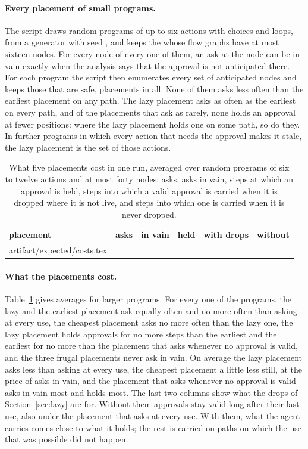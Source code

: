\documentclass[acmsmall,nonacm,screen]{acmart}
\makeatletter
\newcommand{\claim}[2]{#2}
\newcommand{\rows}[1]{\@@input artifact/expected/#1.tex }
\makeatother
\begin{document}
\paragraph{Every placement of small programs.} The script draws random programs of up to
six actions with choices and loops, from a generator with seed \exSeed{}, and keeps the
\exGraphs{} whose flow graphs have at most sixteen nodes. \claim{frugal}{For every node of
every one of them, an ask at the node can be in vain exactly when the analysis says that
the approval is not anticipated there.} For each program the script then enumerates every
set of anticipated nodes and keeps those that are safe, \exPlacements{} placements in all.
\claim{earliest}{None of them asks less often than the earliest placement on any path.}
\claim{lazy}{The lazy placement asks as often as the earliest on every path, and of the
\exOptimal{} placements that ask as rarely, none holds an approval at fewer positions: where
the lazy placement holds one on some path, so do they.} \claim{one-shot}{In \exOneShot{}
further programs in which every action that needs the approval makes it stale, the lazy
placement is the set of those actions.}

\begin{table}
\caption{What five placements cost in one run, averaged over \exPrograms{} random programs
of six to twelve actions and at most forty nodes: asks, asks in vain, steps at which an approval is held, steps into
which a valid approval is carried when it is dropped where it is not live, and steps into
which one is carried when it is never dropped.}
\label{tab:costs}
\small
\begin{tabular}{lrrrrr}
\toprule
placement & asks & in vain & held & with drops & without \\
\midrule
\rows{costs}
\bottomrule
\end{tabular}
\end{table}

\paragraph{What the placements cost.} Table~\ref{tab:costs} gives averages for larger
programs. \claim{costs}{For every one of the programs, the lazy and the earliest placement
ask equally often and no more often than asking at every use, the cheapest placement asks
no more often than the lazy one, the lazy placement holds approvals for no more steps than
the earliest and the earliest for no more than the placement that asks whenever no approval
is valid, and the three frugal placements never ask in vain. On average the lazy placement
asks less than asking at every use, the cheapest placement a little less still, at the
price of asks in vain, and the placement that asks whenever no approval is valid asks in
vain most and holds most.} The last two columns show what the drops of
Section~\ref{sec:lazy} are for. Without them approvals stay valid long after their last use,
also under the placement that asks at every use. With them, what the agent carries comes
close to what it holds; the rest is carried on paths on which the use that was possible did
not happen.
\end{document}
